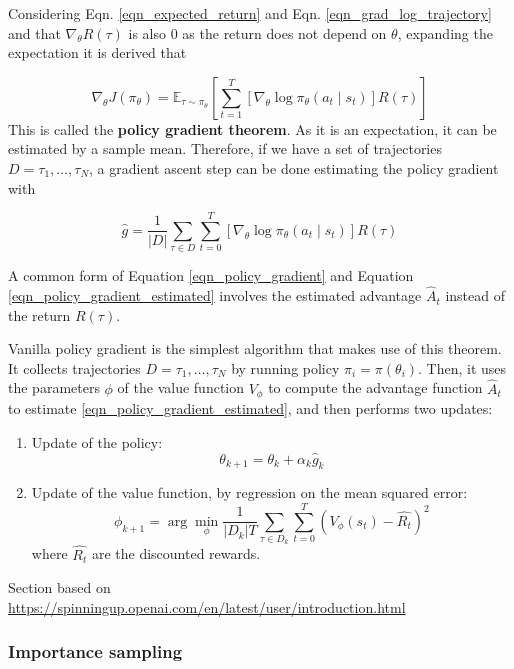 \documentclass[12pt, english]{article}
\begin{document}
Considering Eqn. \ref{eqn_expected_return} and Eqn. \ref{eqn_grad_log_trajectory} and that $\nabla_\theta R(\tau)$ is also $0$ as the return does not depend on $\theta$, expanding the expectation it is derived that

\begin{equation}
  \label{eqn_policy_gradient}
  \nabla_\theta J(\pi_\theta) = \mathbb{E}_{\tau \sim \pi_\theta} [\sum_{t=1}^T[\nabla_\theta \log \pi_\theta (a_t \mid s_t)] R(\tau)]
\end{equation}
%
This is called the \textbf{policy gradient theorem}. As it is an expectation, it can be estimated by a sample mean. Therefore, if we have a set of trajectories $D = {\tau_1, \dots, \tau_N}$, a gradient ascent step can be done estimating the policy gradient with

\begin{equation}
  \label{eqn_policy_gradient_estimated}
  \hat{g} = \frac{1}{|D|} \sum_{\tau \in D} \sum_{t=0}^T[\nabla_\theta \log \pi_\theta (a_t \mid s_t)] R(\tau)
\end{equation}

A common form of Equation \ref{eqn_policy_gradient} and Equation \ref{eqn_policy_gradient_estimated} involves the estimated advantage $\hat{A}_t$ instead of the return $R(\tau)$.

Vanilla policy gradient is the simplest algorithm that makes use of this theorem. It collects trajectories $D = {\tau_1, \dots, \tau_N}$ by running policy $\pi_i = \pi(\theta_i)$. Then, it uses the parameters $\phi$ of the value function $V_\phi$ to compute the advantage function $\hat{A}_t$ to estimate \ref{eqn_policy_gradient_estimated}, and then performs two updates:

\begin{enumerate}
  \item Update of the policy:
  $$\theta_{k+1} = \theta_k + \alpha_k \hat{g}_k$$
  \item Update of the value function, by regression on the mean squared error:
  $$\phi_{k+1} = \arg\min_\phi \frac{1}{|D_k|T} \sum_{\tau \in D_k} \sum_{t=0}^T (V_\phi(s_t) - \hat{R_t})^2$$
  where $\hat{R_t}$ are the discounted rewards.
\end{enumerate}

Section based on \url{https://spinningup.openai.com/en/latest/user/introduction.html}

\subsubsection{Importance sampling}
\end{document}

